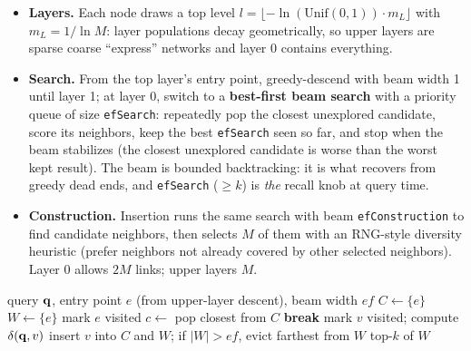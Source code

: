 \begin{itemize}
    \item \textbf{Layers.} Each node draws a top level $l = \lfloor -\ln(\mathrm{Unif}(0,1)) \cdot m_L \rfloor$ with $m_L = 1/\ln M$: layer populations decay geometrically, so upper layers are sparse coarse ``express'' networks and layer 0 contains everything.
    \item \textbf{Search.} From the top layer's entry point, greedy-descend with beam width 1 until layer 1; at layer 0, switch to a \textbf{best-first beam search} with a priority queue of size \texttt{efSearch}: repeatedly pop the closest unexplored candidate, score its neighbors, keep the best \texttt{efSearch} seen so far, and stop when the beam stabilizes (the closest unexplored candidate is worse than the worst kept result). The beam is bounded backtracking: it is what recovers from greedy dead ends, and \texttt{efSearch} ($\ge k$) is \emph{the} recall knob at query time.
    \item \textbf{Construction.} Insertion runs the same search with beam \texttt{efConstruction} to find candidate neighbors, then selects $M$ of them with an RNG-style diversity heuristic (prefer neighbors not already covered by other selected neighbors). Layer 0 allows $2M$ links; upper layers $M$.
\end{itemize}

\begin{algorithm}[H]
\caption{HNSW layer-0 beam search (the \texttt{efSearch} loop)}
\begin{algorithmic}[1]
\REQUIRE query $\mathbf{q}$, entry point $e$ (from upper-layer descent), beam width $ef$
\STATE $C \gets \{e\}$ 
\STATE $W \gets \{e\}$ 
\STATE mark $e$ visited
    \STATE $c \gets$ pop closest from $C$
        \STATE \textbf{break} 
    \ENDIF
        \STATE mark $v$ visited; compute $\delta(\mathbf{q}, v)$
            \STATE insert $v$ into $C$ and $W$; if $|W| > ef$, evict farthest from $W$
        \ENDIF
    \ENDFOR
\ENDWHILE
\RETURN top-$k$ of $W$
\end{algorithmic}
\end{algorithm}


